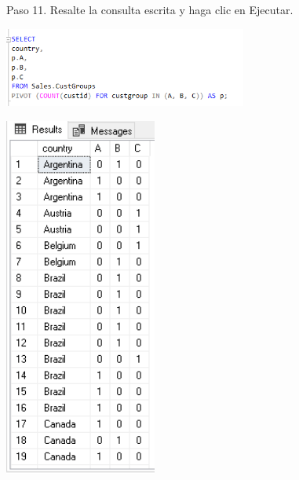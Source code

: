 \begin{flushleft}
Paso 11. Resalte la consulta escrita y haga clic en Ejecutar.
\textbf{}\\
\begin{center}
	\includegraphics[width=8cm]{./Imagenes/img11} 
	\end{center}
\begin{center}
	\includegraphics[width=5cm]{./Imagenes/img111} 
	\end{center}


\end{flushleft}
